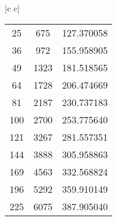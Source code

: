 \begin{tabular}{|c c|}
\begin{tabular}{|c|c|c}
        25  &       675 &  127.370058 \\
        36  &       972 &  155.958905 \\
        49  &      1323 &  181.518565 \\
        64  &      1728 &  206.474669 \\
        81  &      2187 &  230.737183 \\
        100  &      2700 &  253.775640 \\
        121  &      3267 &  281.557351 \\
        144  &      3888 &  305.958863 \\
        169 &      4563 &  332.568824 \\
        196 &      5292 &  359.910149 \\
        225 &      6075 &  387.905040 \\
        \bottomrule
    \end{tabular}
    \label{benchmark_table_1}
\end{tabular}
